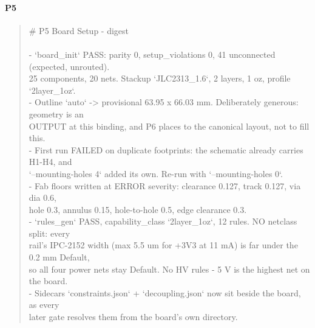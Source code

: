 \documentclass[11pt,a4paper]{article}
\begin{document}
\paragraph*{P5}
\begin{quote}\small\ttfamily\raggedright
\# P5 Board Setup - digest\\
~\\
- `board\_init` PASS: parity 0, setup\_violations 0, 41 unconnected (expected, unrouted).\\
  25 components, 20 nets. Stackup `JLC2313\_1.6`, 2 layers, 1 oz, profile `2layer\_1oz`.\\
- Outline `auto` -\textgreater{} provisional 63.95 x 66.03 mm. Deliberately generous: geometry is an\\
  OUTPUT at this binding, and P6 places to the canonical layout, not to fill this.\\
- First run FAILED on duplicate footprints: the schematic already carries H1-H4, and\\
  `--mounting-holes 4` added its own. Re-run with `--mounting-holes 0`.\\
- Fab floors written at ERROR severity: clearance 0.127, track 0.127, via dia 0.6,\\
  hole 0.3, annulus 0.15, hole-to-hole 0.5, edge clearance 0.3.\\
- `rules\_gen` PASS, capability\_class `2layer\_1oz`, 12 rules. NO netclass split: every\\
  rail's IPC-2152 width (max 5.5 um for +3V3 at 11 mA) is far under the 0.2 mm Default,\\
  so all four power nets stay Default. No HV rules - 5 V is the highest net on the board.\\
- Sidecars `constraints.json` + `decoupling.json` now sit beside the board, as every\\
  later gate resolves them from the board's own directory.
\end{quote}
\end{document}
